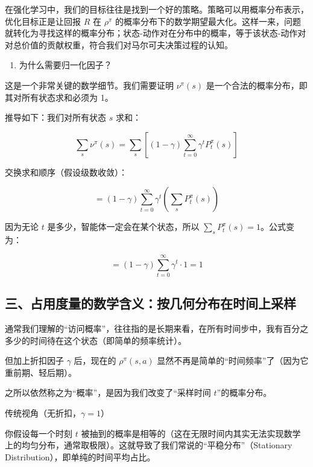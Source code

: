 在强化学习中，我们的目标往往是找到一个好的策略。策略可以用概率分布表示，优化目标正是让回报 \(R\) 在 \(\rho^\pi\) 的概率分布下的数学期望最大化。这样一来，问题就转化为寻找这样的概率分布；状态-动作对在分布中的概率，等于该状态-动作对对总价值的贡献权重，符合我们对马尔可夫决策过程的认知。

\begin{enumerate}
\def\labelenumi{\arabic{enumi}.}
\setcounter{enumi}{1}
\tightlist
\item
  为什么需要归一化因子？
\end{enumerate}

这是一个非常关键的数学细节。我们需要证明 \(\nu^\pi(s)\) 是一个合法的概率分布，即其对所有状态求和必须为 1。

推导如下：我们对所有状态 \(s\) 求和：

\[
\sum_s \nu^\pi(s) = \sum_s\left[(1-\gamma)\sum_{t=0}^{\infty}\gamma^t P_t^\pi(s)\right]
\]

交换求和顺序（假设级数收敛）：

\[
= (1-\gamma)\sum_{t=0}^{\infty}\gamma^t\left(\sum_s P_t^\pi(s)\right)
\]

因为无论 \(t\) 是多少，智能体一定会在某个状态，所以 \(\sum_s P_t^\pi(s)=1\)。公式变为：

\[
= (1-\gamma)\sum_{t=0}^{\infty}\gamma^t \cdot 1 = 1
\]

\hypertarget{ux4e09ux5360ux7528ux5ea6ux91cfux7684ux6570ux5b66ux542bux4e49ux6309ux51e0ux4f55ux5206ux5e03ux5728ux65f6ux95f4ux4e0aux91c7ux6837}{%
\subsection{三、占用度量的数学含义：按几何分布在时间上采样}\label{ux4e09ux5360ux7528ux5ea6ux91cfux7684ux6570ux5b66ux542bux4e49ux6309ux51e0ux4f55ux5206ux5e03ux5728ux65f6ux95f4ux4e0aux91c7ux6837}}

通常我们理解的``访问概率''，往往指的是长期来看，在所有时间步中，我有百分之多少的时间待在这个状态（即简单的频率统计）。

但加上折扣因子 \(\gamma\) 后，现在的 \(\rho^\pi(s,a)\) 显然不再是简单的``时间频率''了（因为它重前期、轻后期）。

之所以依然称之为``概率''，是因为我们改变了``采样时间 \(t\)''的概率分布。

传统视角（无折扣，\(\gamma=1\)）

你假设每一个时刻 \(t\) 被抽到的概率是相等的（这在无限时间内其实无法实现数学上的均匀分布，通常取极限）。这就导致了我们常说的``平稳分布''（Stationary Distribution），即单纯的时间平均占比。

